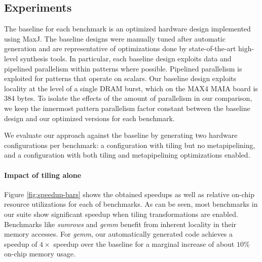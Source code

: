 \subsection{Experiments}
The baseline for each benchmark is an optimized hardware design implemented using MaxJ.
The baseline designs were manually tuned after automatic generation and are
representative of optimizations done by state-of-the-art high-level synthesis tools.
In particular, each baseline design exploits data and pipelined parallelism within patterns where possible.
Pipelined parallelism is exploited for patterns that operate on scalars. Our baseline design
exploits locality at the level of a single DRAM burst, which on the MAX4 MAIA board is 384 bytes.
To isolate the effects of the amount of parallelism in our comparison, we keep
the innermost pattern parallelism factor constant between the baseline design and our optimized versions for each benchmark.


We evaluate our approach against the baseline by generating two hardware configurations per benchmark:
a configuration with tiling but no metapipelining, and a configuration with both tiling and metapipelining optimizations enabled.

\paragraph{Impact of tiling alone}
Figure \ref{fig:speedup-bars} shows the obtained speedups as well as relative on-chip resource utilizations for each of benchmarks.
As can be seen, most benchmarks in our suite show significant speedup when tiling
transformations are enabled. Benchmarks like \emph{sumrows} and \emph{gemm}
benefit from inherent locality in their memory accesses. For \emph{gemm}, our automatically generated code
achieves a speedup of $4\times$ speedup over the baseline for a marginal increase of about $10\%$ on-chip memory usage.


